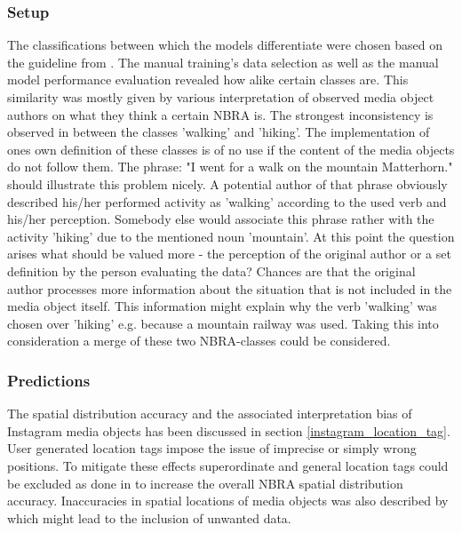 \subsubsection*{Setup} 
The classifications between which the models differentiate were chosen based on the guideline from \parencite{IFL2018}. The manual training's data selection as well as the manual model performance evaluation revealed how alike certain classes are. This similarity was mostly given by various interpretation of observed media object authors on what they think a certain NBRA is. The strongest inconsistency is observed in between the classes 'walking' and 'hiking'. The implementation of ones own definition of these classes is of no use if the content of the media objects do not follow them. The phrase: "I went for a walk on the mountain Matterhorn." should illustrate this problem nicely. A potential author of that phrase obviously described his/her performed activity as 'walking' according to the used verb and his/her perception. Somebody else would associate this phrase rather with the activity 'hiking' due to the mentioned noun 'mountain'. At this point the question arises what should be valued more - the perception of the original author or a set definition by the person evaluating the data? Chances are that the original author processes more information about the situation that is not included in the media object itself. This information might explain why the verb 'walking' was chosen over 'hiking' e.g. because a mountain railway was used. 
Taking this into consideration a merge of these two NBRA-classes could be considered.

\subsubsection*{Predictions}
The spatial distribution accuracy and the associated interpretation bias of Instagram media objects has been discussed in section \ref{instagram_location_tag}. User generated location tags impose the issue of imprecise or simply wrong positions. To mitigate these effects superordinate and general location tags could be excluded as done in \parencite{Heikinheimo2017} to increase the overall NBRA spatial distribution accuracy. Inaccuracies in spatial locations of media objects was also described by \parencite{Lee2016} which might lead to the inclusion of unwanted data.

